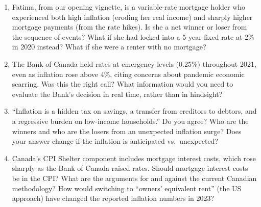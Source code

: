 \begin{enumerate}

\item Fatima, from our opening vignette, is a variable-rate mortgage holder
who experienced both high inflation (eroding her real income) and sharply
higher mortgage payments (from the rate hikes). Is she a net winner or loser
from the sequence of events? What if she had locked into a 5-year fixed rate
at 2\% in 2020 instead? What if she were a renter with no mortgage?

\item The Bank of Canada held rates at emergency levels (0.25\%) throughout
2021, even as inflation rose above 4\%, citing concerns about pandemic
economic scarring. Was this the right call? What information would you need
to evaluate the Bank's decision in real time, rather than in hindsight?

\item ``Inflation is a hidden tax on savings, a transfer from creditors to
debtors, and a regressive burden on low-income households.'' Do you agree?
Who are the winners and who are the losers from an unexpected inflation
surge? Does your answer change if the inflation is anticipated vs.\ unexpected?

\item Canada's CPI Shelter component includes mortgage interest costs, which
rose sharply as the Bank of Canada raised rates. Should mortgage interest
costs be in the CPI? What are the arguments for and against the current
Canadian methodology? How would switching to ``owners' equivalent rent''
(the US approach) have changed the reported inflation numbers in 2023?

\end{enumerate}
